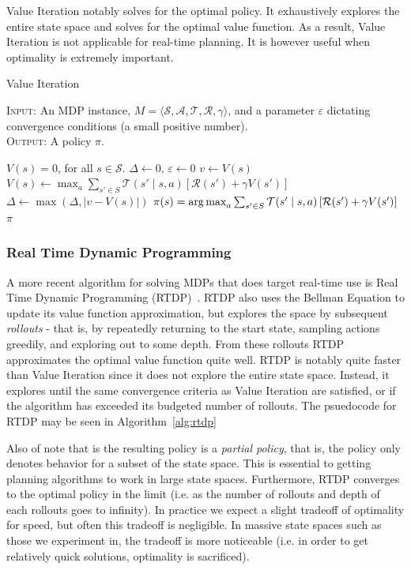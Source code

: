 \documentclass[11pt]{article}
\begin{document}
Value Iteration notably solves for the optimal policy. It exhaustively explores the entire state space and solves for the optimal value function. As a result, Value Iteration is not applicable for real-time planning. It is however useful when optimality is extremely important.

\begin{algorithm}[t]
\caption{Value Iteration}\label{alg:value_iteration}
\textsc{Input:} An MDP instance, $M = \langle \mathcal{S}, \mathcal{A}, \mathcal{T}, \mathcal{R}, \gamma \rangle$, and a parameter $\varepsilon$ dictating convergence conditions (a small positive number). \\
\textsc{Output:} A policy $\pi$.
\begin{algorithmic}[1]
\State $V(s) = 0$, for all $s \in \mathcal{S}$.
\State $\Delta \gets 0$, $\varepsilon \gets 0$
\While{$\Delta > \varepsilon$}
\State $v \gets V(s)$
\State $V(s) \gets \max_a \sum_{s' \in S} \mathcal{T}(s' \mid s, a) \left[\mathcal{R}(s') + \gamma V(s') \right]$
\State $\Delta \gets \max(\Delta, |v - V(s)|)$
\EndFor
\EndWhile
{}
\State $\pi(s) = \operatorname*{arg\,max}_a \sum_{s' \in S} \mathcal{T}(s' \mid s, a) \left[\mathcal{R}(s') + \gamma V(s') \right]$
\EndFor
{} $\pi$
\end{algorithmic}
\end{algorithm}

\subsubsection{Real Time Dynamic Programming}

A more recent algorithm for solving MDPs that does target real-time use is Real Time Dynamic Programming (RTDP)~\cite{barto1995learning}. RTDP also uses the Bellman Equation to update its value function approximation, but explores the space by subsequent {\it rollouts} - that is, by repeatedly returning to the start state, sampling actions greedily, and exploring out to some depth. From these rollouts RTDP approximates the optimal value function quite well. RTDP is notably quite faster than Value Iteration since it does not explore the entire state space. Instead, it explores until the same convergence criteria as Value Iteration are satisfied, or if the algorithm has exceeded its budgeted number of rollouts. The psuedocode for RTDP may be seen in Algorithm~\ref{alg:rtdp}

Also of note that is the resulting policy is a {\it partial policy}, that is, the policy only denotes behavior for a subset of the state space. This is essential to getting planning algorithms to work in large state spaces. Furthermore, RTDP converges to the optimal policy in the limit (i.e. as the number of rollouts and depth of each rollouts goes to infinity). In practice we expect a slight tradeoff of optimality for speed, but often this tradeoff is negligible. In massive state spaces such as those we experiment in, the tradeoff is more noticeable (i.e. in order to get relatively quick solutions, optimality is sacrificed).
\end{document}
